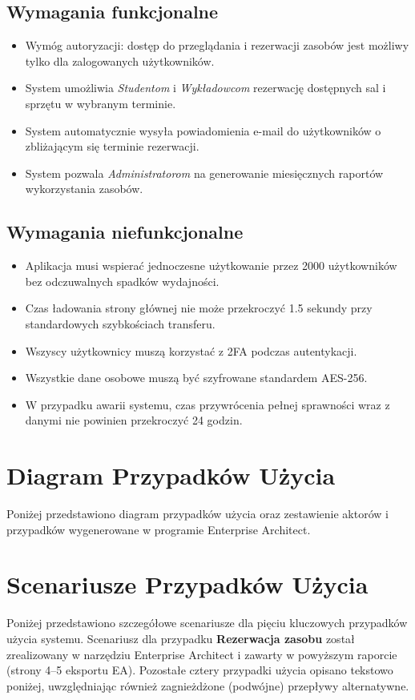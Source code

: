 \documentclass[11pt, a4paper]{article}
\begin{document}
\subsection{Wymagania funkcjonalne}
\begin{itemize}
    \item Wymóg autoryzacji: dostęp do przeglądania i rezerwacji zasobów jest możliwy tylko dla zalogowanych użytkowników.
    \item System umożliwia \textit{Studentom} i \textit{Wykładowcom} rezerwację dostępnych sal i sprzętu w wybranym terminie.
    \item System automatycznie wysyła powiadomienia e-mail do użytkowników o zbliżającym się terminie rezerwacji.
    \item System pozwala \textit{Administratorom} na generowanie miesięcznych raportów wykorzystania zasobów.
\end{itemize}

\subsection{Wymagania niefunkcjonalne}
\begin{itemize}
    \item Aplikacja musi wspierać jednoczesne użytkowanie przez 2000 użytkowników bez odczuwalnych spadków wydajności.
    \item Czas ładowania strony głównej nie może przekroczyć 1.5 sekundy przy standardowych szybkościach transferu.
    \item Wszyscy użytkownicy muszą korzystać z 2FA podczas autentykacji.
    \item Wszystkie dane osobowe muszą być szyfrowane standardem AES-256.
    \item W przypadku awarii systemu, czas przywrócenia pełnej sprawności wraz z danymi nie powinien przekroczyć 24 godzin.
\end{itemize}

\newpage
\section{Diagram Przypadków Użycia}
Poniżej przedstawiono diagram przypadków użycia oraz zestawienie aktorów i przypadków wygenerowane w programie Enterprise Architect.


\newpage
\section{Scenariusze Przypadków Użycia}
Poniżej przedstawiono szczegółowe scenariusze dla pięciu kluczowych przypadków użycia systemu. Scenariusz dla przypadku \textbf{Rezerwacja zasobu} został zrealizowany w narzędziu Enterprise Architect i zawarty w powyższym raporcie (strony 4--5 eksportu EA). Pozostałe cztery przypadki użycia opisano tekstowo poniżej, uwzględniając również zagnieżdżone (podwójne) przepływy alternatywne.
\end{document}
